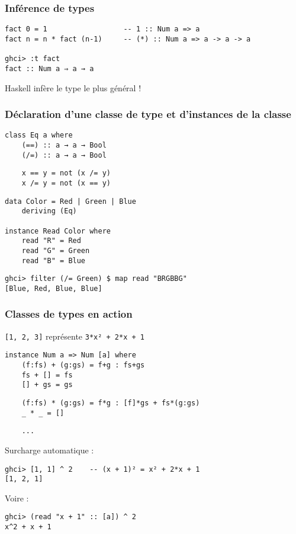 \documentclass[10pt]{beamer}
\begin{document}
\begin{frame}[fragile]
\frametitle{Inférence de types}

\begin{verbatim}
fact 0 = 1                  -- 1 :: Num a => a
fact n = n * fact (n-1)     -- (*) :: Num a => a -> a -> a

ghci> :t fact
fact :: Num a ⇒ a → a
\end{verbatim}

Haskell infère le type le plus général !
\end{frame}



\begin{frame}[fragile]
\frametitle{Déclaration d'une classe de type et d'instances de la classe}
\begin{verbatim}
class Eq a where
    (==) :: a → a → Bool
    (/=) :: a → a → Bool
\end{verbatim}
\pause
\begin{verbatim}
    x == y = not (x /= y)
    x /= y = not (x == y)
\end{verbatim}
\pause
\begin{verbatim}
data Color = Red | Green | Blue
    deriving (Eq)

instance Read Color where
    read "R" = Red
    read "G" = Green
    read "B" = Blue
\end{verbatim}
\pause
\begin{verbatim}
ghci> filter (/= Green) $ map read "BRGBBG"
[Blue, Red, Blue, Blue]
\end{verbatim}
\end{frame}




\begin{frame}[fragile]
\frametitle{Classes de types en action}

\verb|[1, 2, 3]| représente \verb|3*x² + 2*x + 1|

\begin{verbatim}
instance Num a => Num [a] where
    (f:fs) + (g:gs) = f+g : fs+gs
    fs + [] = fs
    [] + gs = gs
\end{verbatim}
\pause
\begin{verbatim}
    (f:fs) * (g:gs) = f*g : [f]*gs + fs*(g:gs)
    _ * _ = []
\end{verbatim}
\pause
\begin{verbatim}
    ...
\end{verbatim}

Surcharge automatique :

\begin{verbatim}
ghci> [1, 1] ^ 2    -- (x + 1)² = x² + 2*x + 1
[1, 2, 1]
\end{verbatim}

\pause

Voire :

\begin{verbatim}
ghci> (read "x + 1" :: [a]) ^ 2
x^2 + x + 1
\end{verbatim}

\end{frame}
\end{document}
